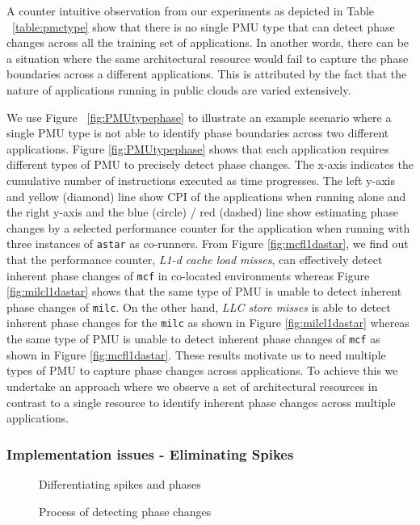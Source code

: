 \documentclass{sig-alternate}
\begin{document}
A counter intuitive observation from our experiments as depicted in Table ~\ref{table:pmctype} show that there is no single PMU type that can detect phase changes across all the training set of applications. In another words, there can be a situation where the same architectural resource would fail to capture the phase boundaries across a different applications. This is attributed by the fact that the nature of applications running in public clouds are varied extensively.

We use Figure ~\ref{fig:PMUtypephase} to illustrate an example scenario where a single PMU type is not able to identify phase boundaries across two different applications. Figure \ref{fig:PMUtypephase} shows that each application requires different types of PMU to precisely detect phase changes. The x-axis indicates the cumulative number of instructions executed as time progresses. The left y-axis and yellow (diamond) line show CPI of the applications when running alone and the right y-axis and the blue (circle) / red (dashed) line show estimating phase changes by a selected performance counter for the application when running with three instances of \texttt{astar} as co-runners. From Figure \ref{fig:mcfl1dastar}, we find out that the performance counter, \textit{L1-d cache load misses}, can effectively detect inherent phase changes of \texttt{mcf} in co-located environments whereas Figure \ref{fig:milcl1dastar} shows that the same type of PMU is unable to detect inherent phase changes of \texttt{milc}. On the other hand, \textit{LLC store misses} is able to detect inherent phase changes for the \texttt{milc} as shown in Figure \ref{fig:milcl1dastar} whereas the same type of PMU is unable to detect inherent phase changes of \texttt{mcf} as shown in Figure \ref{fig:mcfl1dastar}. These results motivate us to need multiple types of PMU to capture phase changes across applications. To achieve this we undertake an approach where we observe a set of architectural resources in contrast to a single resource to identify inherent phase changes across multiple applications.
\subsubsection{Implementation issues - Eliminating Spikes}
\label{subsubsec:Implementationissues-EliminatingSpikes}
\begin{figure}
\centering
\begin{minipage}[t]{1\columnwidth}
\centering
{}
\caption{Differentiating spikes and phases}
\label{fig:noise_elimination}
\end{minipage}
\end{figure}
\begin{figure*}
\centering
\begin{minipage}[t]{1.85\columnwidth}
\centering
{}
\caption{Process of detecting phase changes}
\label{fig:detect_phases}
\end{minipage}
\end{figure*}
\end{document}

